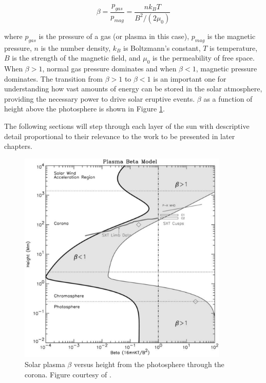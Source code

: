 \begin{equation}
    \label{eq:beta}
    \beta = \frac{p_{gas}}{p_{mag}} = \frac{nk_BT}{B^2/(2\mu_0)}
\end{equation}

\noindent where $p_{gas}$ is the pressure of a gas (or plasma in this case), $p_{mag}$ is the magnetic pressure, $n$ is the number density, $k_B$ is Boltzmann's constant, $T$ is temperature, $B$ is the strength of the magnetic field, and $\mu_0$ is the permeability of free space. When $\beta > 1$, normal gas pressure dominates and when $\beta < 1$, magnetic pressure dominates. The transition from $\beta > 1$ to $\beta < 1$ is an important one for understanding how vast amounts of energy can be stored in the solar atmosphere, providing the necessary power to drive solar eruptive events. $\beta$ as a function of height above the photosphere is shown in Figure \ref{fig:betavsheight}. 

The following sections will step through each layer of the sun with descriptive detail proportional to their relevance to the work to be presented in later chapters. 

\begin{figure}[!h]
    \begin{center}
	    \includegraphics[width=100mm]{Images/BetaVsHeight.png}
    \end{center}
    \caption[Solar plasma $\beta$ versus height]{
        Solar plasma $\beta$ versus height from the photosphere through the corona. Figure courtesy of
        \citet{Gary2001}.         
    }
    \label{fig:betavsheight}
\end{figure}

